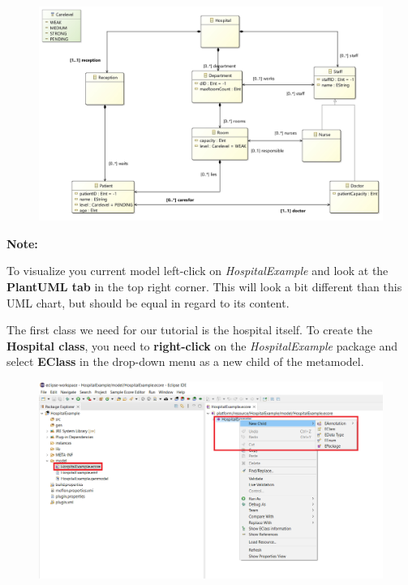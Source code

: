\begin{figure}[h]
    \centering
    \includegraphics[scale=0.9, width= \textwidth]{pictures/model_finished.jpg}
    \caption{}
    \label{goal model}
\end{figure}

\textbf{Note:}

To visualize you current model left-click on \textit{\textsf{HospitalExample}} and look at the \textbf{PlantUML tab} in the top right corner. This will look a bit different than this UML chart, but should be equal in regard to its content.

\clearpage

The first class we need for our tutorial is the hospital itself. To create the \textbf{Hospital class}, you need to \textbf{right-click} on the \textit{\textsf{HospitalExample}} package and select \textbf{EClass} in the drop-down menu as a new child of the metamodel.\newline

\begin{figure}[h]
    \centering
    \includegraphics[scale=0.5, width= \textwidth]{pictures/new_child.png}
    \caption{}
    \label{project creation}
\end{figure}

